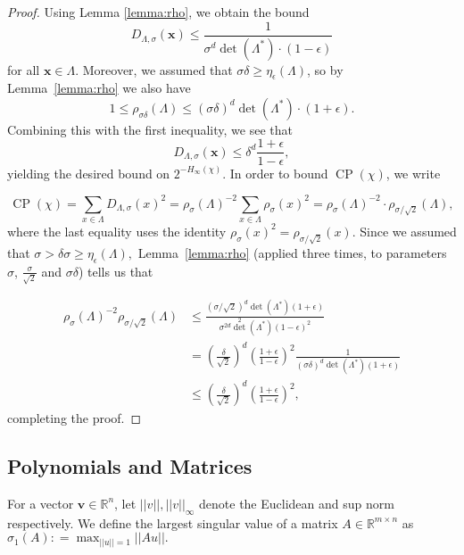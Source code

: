 \documentclass[11pt]{article}
\newcommand{\R}{\mathbb{R}}
\newcommand{\dabs}[1]{||#1 ||}
\DeclareMathOperator{\cp}{CP}
\begin{document}
\begin{proof}
Using Lemma \ref{lemma:rho}, we obtain the bound
\[D_{\Lambda,\sigma} (\textbf{x}) \leq \frac{1}{\sigma^d \det(\Lambda^*) \cdot (1-\epsilon) }
\]
for all $\textbf{x} \in \Lambda$. %
 Moreover, we assumed that $\sigma \delta \geq \eta_\epsilon(\Lambda)$, so by Lemma~\ref{lemma:rho} we also have
\[
1\leq \rho_{\sigma\delta}(\Lambda) \leq (\sigma \delta)^d \det(\Lambda^*) \cdot (1+\epsilon).
\]
Combining this with the first inequality, we see that
\[
D_{\Lambda,\sigma} (\textbf{x})\leq \delta^d \frac{1+\epsilon}{1-\epsilon},
\]
yielding the desired bound on $2^{-H_\infty(\chi)}$. In order to bound $\cp(\chi)$, we write 

\[\cp(\chi) = \sum_{x \in \Lambda} D_{\Lambda, \sigma}(x)^2=\rho_{\sigma}(\Lambda)^{-2} \sum_{x\in \Lambda} \rho_{\sigma} (x)^2 = \rho_{\sigma }(\Lambda)^{-2} \cdot \rho_{\sigma/\sqrt{2} }(\Lambda),
\]
where the last equality uses the identity $\rho_{\sigma }(x)^2 = \rho_{\sigma/\sqrt{2} } (x)$. Since we assumed that $\sigma > \delta \sigma \geq \eta_{\epsilon}(\Lambda),$ Lemma~\ref{lemma:rho} (applied three times, to parameters $\sigma$, $\frac \sigma {\sqrt 2}$ and $\sigma \delta$) tells us that

\begin{align*}
\rho_{\sigma }(\Lambda)^{-2} \rho_{\sigma/\sqrt{2} }(\Lambda)&\leq \frac{(\sigma/\sqrt{2})^d \det (\Lambda^*) (1+\epsilon) }{\sigma^{2d} \det^2 (\Lambda^*) (1-\epsilon)^2} 
\\ &= \left(\frac \delta {\sqrt 2}\right)^d \left(\frac{1+\epsilon}{1-\epsilon}\right)^2 \frac{1}{( \sigma \delta)^d \det(\Lambda^*) (1+\epsilon) } 
\\ &\leq \left(\frac {\delta}{\sqrt 2}\right)^d (\frac{1+\epsilon}{1-\epsilon})^2,
\end{align*}
completing the proof. %
\end{proof}
\subsection{Polynomials and Matrices}
For a vector $\textbf{v} \in \R^n$, let $\dabs{v}, \dabs{v}_{\infty}$ denote the Euclidean and sup norm respectively. We define the largest singular value of a matrix $A\in \R^{m\times n}$ as $\sigma_1(A) : = \max_{\dabs{u} = 1} \dabs{A u}.$
\end{document}
